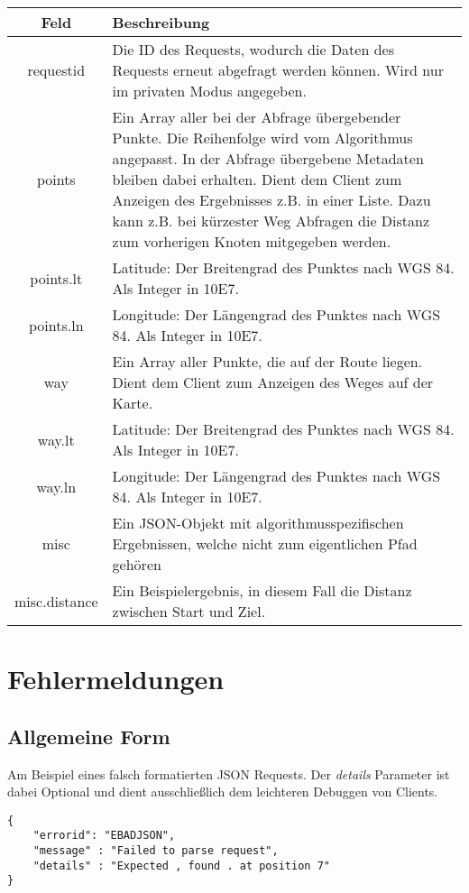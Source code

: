 \documentclass[ngerman,titlepage,parskip=true]{scrartcl}
\begin{document}
		\begin{tabular}{|c|p{12cm}|}
			\hline
			\textbf{Feld} & \textbf{Beschreibung} \\ 
			\hline \hline

			requestid & Die ID des Requests, wodurch die Daten des Requests erneut abgefragt werden können. Wird nur im privaten Modus angegeben.\\
			\hline
			
			points & Ein Array aller bei der Abfrage übergebender Punkte. Die Reihenfolge wird vom Algorithmus angepasst. In der Abfrage übergebene Metadaten bleiben dabei erhalten. Dient dem Client zum Anzeigen des Ergebnisses z.B. in einer Liste. Dazu kann z.B. bei kürzester Weg Abfragen die Distanz zum vorherigen Knoten mitgegeben werden.\\
			\hline
			
	    	points.lt & Latitude: Der Breitengrad des Punktes nach WGS 84. Als Integer in 10E7.\\ 
	    	\hline
	    	
	    	points.ln & Longitude: Der Längengrad des Punktes nach WGS 84. Als Integer in 10E7.\\
	    	\hline
	    	
	    	way & Ein Array aller Punkte, die auf der Route liegen. Dient dem Client zum Anzeigen des Weges auf der Karte.\\
			\hline
			
	    	way.lt & Latitude: Der Breitengrad des Punktes nach WGS 84. Als Integer in 10E7.\\ 
	    	\hline
	    	
	    	way.ln & Longitude: Der Längengrad des Punktes nach WGS 84. Als Integer in 10E7.\\
	    	\hline
	    	
	    	misc & Ein JSON-Objekt mit algorithmusspezifischen Ergebnissen, welche nicht zum eigentlichen Pfad gehören \\
	    	\hline
	    	
	    	misc.distance & Ein Beispielergebnis, in diesem Fall die Distanz zwischen Start und Ziel.\\
	    	\hline
		\end{tabular}

\section{Fehlermeldungen}
\subsection{Allgemeine Form}
Am Beispiel eines falsch formatierten JSON Requests.
Der \textit{details} Parameter ist dabei Optional und dient ausschließlich dem leichteren Debuggen von 
Clients.
	\begin{lstlisting}
{
	"errorid": "EBADJSON",
	"message" : "Failed to parse request",
	"details" : "Expected , found . at position 7"
}
	\end{lstlisting}
\end{document}
